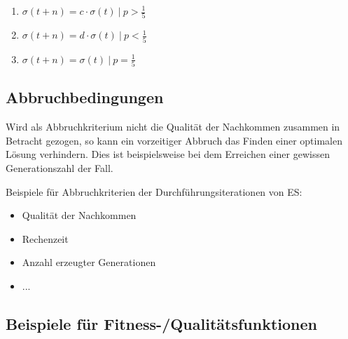 \begin{enumerate}
	\item $\sigma(t+n) = c \cdot \sigma(t)\ |\ p > \frac{1}{5}$
    \item $\sigma(t+n) = d \cdot \sigma(t)\ |\ p < \frac{1}{5}$
    \item $\sigma(t+n) = \sigma(t)\ |\ p = \frac{1}{5}$
\end{enumerate}

\subsection{Abbruchbedingungen}

Wird als Abbruchkriterium nicht die Qualität der Nachkommen zusammen in Betracht gezogen, so kann ein vorzeitiger Abbruch das Finden einer optimalen Lösung verhindern.
Dies ist beispielsweise bei dem Erreichen einer gewissen Generationszahl der Fall.

Beispiele für Abbruchkriterien der Durchführungsiterationen von ES:
\begin{itemize}
	\item Qualität der Nachkommen
	\item Rechenzeit
	\item Anzahl erzeugter Generationen
	\item ...
\end{itemize}

\subsection{Beispiele für Fitness-/Qualitätsfunktionen}




